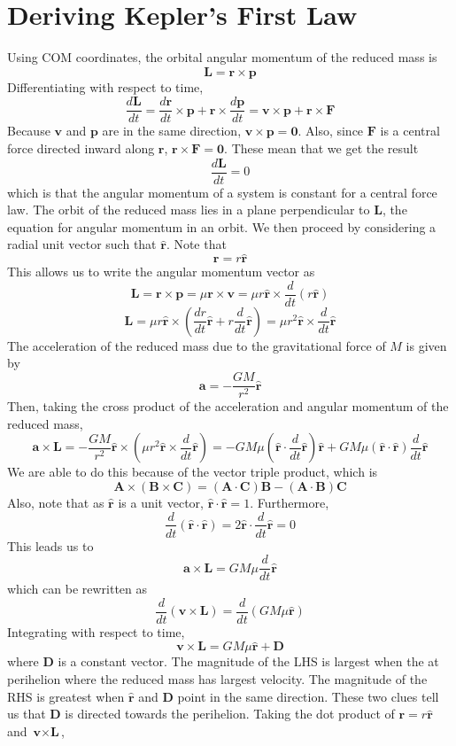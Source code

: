 \documentclass{article}
\begin{document}
\section{Deriving Kepler's First Law}
Using COM coordinates, the orbital angular momentum of the reduced mass is
$$\textbf{L}=\textbf{r}\times\textbf{p}$$
Differentiating with respect to time,
$$\frac{d\textbf{L}}{dt}=\frac{d\textbf{r}}{dt}\times\textbf{p}+\textbf{r}\times\frac{d\textbf{p}}{dt}=\textbf{v}\times\textbf{p}+\textbf{r}\times\textbf{F}$$
Because $\textbf{v}$ and $\textbf{p}$ are in the same direction, $\textbf{v}\times\textbf{p}=\textbf{0}$. Also, since $\textbf{F}$ is a central force directed inward along $\textbf{r}$, $\textbf{r}\times\textbf{F}=\textbf{0}$. These mean that we get the result
$$\frac{d\textbf{L}}{dt}=0$$
which is that the angular momentum of a system is constant for a central force law. The orbit of the reduced mass lies in a plane perpendicular to $\textbf{L}$, the equation for angular momentum in an orbit. We then proceed by considering a radial unit vector such that $\bm{\hat{r}}$. Note that
$$\textbf{r}=r\bm{\hat{r}}$$
This allows us to write the angular momentum vector as 
$$\textbf{L}=\textbf{r}\times\textbf{p}=\mu \textbf{r}\times\textbf{v}=\mu r \bm{\hat{r}}\times\frac{d}{dt}(r\bm{\hat{r}})$$
$$\textbf{L}=\mu r
\bm{\hat{r}}\times(\frac{dr}{dt}\bm{\hat{r}}+r\frac{d}{dt}\bm{\hat{r}})=\mu r^2\bm{\hat{r}}\times\frac{d}{dt}\bm{\hat{r}}$$
The acceleration of the reduced mass due to the gravitational force of ${M}$ is given by
$$\textbf{a}=-\frac{GM}{r^2}\bm{\hat{r}}$$
Then, taking the cross product of the acceleration and angular momentum of the reduced mass, 
$$\textbf{a}\times\textbf{L}=-\frac{GM}{r^2}\bm{\hat{r}}\times(\mu r^2\bm{\hat{r}}\times\frac{d}{dt}\bm{\hat{r}})=-GM\mu (\bm{\hat{r}}\cdot\frac{d}{dt}\bm{\hat{r}})\bm{\hat{r}}+GM\mu (\bm{\hat{r}}\cdot\bm{\hat{r}})\frac{d}{dt}\bm{\hat{r}}$$
We are able to do this because of the vector triple product, which is
$$\textbf{A}\times(\textbf{B}\times\textbf{C})=(\textbf{A}\cdot\textbf{C})\textbf{B}-(\textbf{A}\cdot\textbf{B})\textbf{C}$$
Also, note that as $\bm{\hat{r}}$ is a unit vector, $\bm{\hat{r}}\cdot\bm{\hat{r}}=1$. Furthermore,
$$\frac{d}{dt}(\bm{\hat{r}}\cdot\bm{\hat{r}})=2\bm{\hat{r}}\cdot\frac{d}{dt}\bm{\hat{r}}=0$$
This leads us to 
$$\textbf{a}\times\textbf{L}=GM\mu \frac{d}{dt}\bm{\hat{r}}$$
which can be rewritten as 
$$\frac{d}{dt}(\textbf{v}\times\textbf{L})=\frac{d}{dt}(GM\mu \bm{\hat{r}})$$
Integrating with respect to time, 
$$\textbf{v}\times\textbf{L}=GM\mu \bm{\hat{r}}+\textbf{D}$$
where $\textbf{D}$ is a constant vector. The magnitude of the LHS is largest when the at perihelion where the reduced mass has largest velocity. The magnitude of the RHS is greatest when $\bm{\hat{r}}$ and $\textbf{D}$ point in the same direction. These two clues tell us that $\textbf{D}$ is directed towards the perihelion. Taking the dot product of $\textbf{r}=r\bm{\hat{r}}$ and $\textbf{v}\times\textbf{L}$, 
\end{document}
